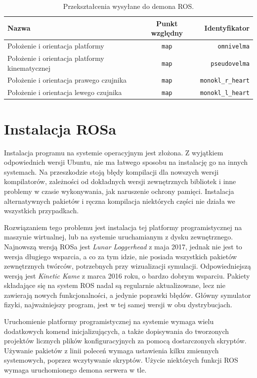 	\begin{table}
		\centering
		\begin{tabular}{l c r}
			Nazwa & Punkt względny & Identyfikator \\
			\hline
			Położenie i orientacja platformy & \texttt{map} & \texttt{omnivelma} \\
			Położenie i orientacja platformy kinematycznej & \texttt{map} & \texttt{pseudovelma} \\
			Położenie i orientacja prawego czujnika & \texttt{map} & \texttt{monokl\_r\_heart} \\
			Położenie i orientacja lewego czujnika & \texttt{map} & \texttt{monokl\_l\_heart} \\
		\end{tabular}
		\caption{Przekształcenia wysyłane do demona ROS.}
		\label{tab:frame_send}
	\end{table}
			
\section{Instalacja ROSa}
	Instalacja programu na systemie operacyjnym jest złożona.
	Z wyjątkiem odpowiednich wersji Ubuntu, nie ma łatwego sposobu na instalację go na innych systemach.
	Na przeszkodzie stoją błędy kompilacji dla nowszych wersji kompilatorów, zależności od dokładnych wersji zewnętrznych bibliotek i 
	inne problemy w czasie wykonywania, jak naruszenie ochrony pamięci. 
	Instalacja alternatywnych pakietów i ręczna kompilacja niektórych części nie działa we wszystkich przypadkach.

	Rozwiązaniem tego problemu jest instalacja tej platformy programistycznej na maszynie wirtualnej, lub na systemie uruchamianym z dysku zewnętrznego. 
	Najnowszą wersją ROSa jest \emph{Lunar Loggerhead} z maja 2017, jednak nie jest to wersja długiego wsparcia, a co za tym idzie, nie posiada wszystkich
	pakietów zewnętrznych twórców, potrzebnych przy wizualizacji symulacji.
	Odpowiedniejszą wersją jest \emph{Kinetic Kame} z marca 2016 roku, o bardzo dobrym wsparciu.
	Pakiety składające się na system ROS nadal są regularnie aktualizowane, lecz nie zawierają nowych funkcjonalności, a jedynie poprawki błędów.
	Główny symulator fizyki, najważniejszy program, jest w tej samej wersji w obu dystrybucjach.

	Uruchomienie platformy programistycznej na systemie wymaga wielu dodatkowych komend inicjalizujących, 
	a także dopisywania do tworzonych projektów licznych plików konfiguracyjnych za pomocą dostarczonych skryptów.
	Używanie pakietów z linii poleceń wymaga ustawienia kilku zmiennych systemowych, poprzez wczytywanie skryptów.
	Użycie niektórych funkcji ROS wymaga uruchomionego demona serwera w tle.

